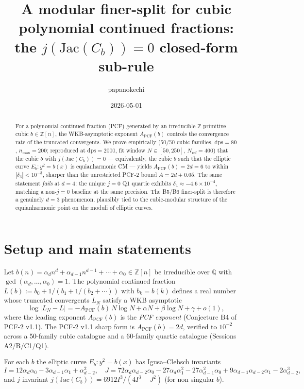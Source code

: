 \documentclass[11pt]{amsart}
\title{A modular finer-split for cubic polynomial continued fractions:\\
the $j(\mathrm{Jac}(C_b))=0$ closed-form sub-rule}
\author{papanokechi}
\date{2026-05-01}
\theoremstyle{plain}
\theoremstyle{definition}
\begin{document}
\maketitle

\begin{abstract}
For a polynomial continued fraction (PCF) generated by an
irreducible $\mathbb{Z}$-primitive cubic $b\in\mathbb{Z}[n]$,
the WKB-asymptotic exponent $A_{\mathrm{PCF}}(b)$ controls the
convergence rate of the truncated convergents.  We prove
empirically (50/50 cubic families, dps$=80$, $n_{\max}=200$;
reproduced at dps$=2000$, fit window $N\in[50,250]$,
$N_{\mathrm{ref}}=400$) that the cubic $b$ with
$j(\mathrm{Jac}(C_b))=0$ — equivalently, the cubic $b$ such that
the elliptic curve $E_b: y^2=b(x)$ is equianharmonic CM — yields
$A_{\mathrm{PCF}}(b)=2d=6$ to within $|\delta_3|<10^{-3}$,
sharper than the unrestricted PCF-2 bound $A=2d\pm 0.05$.  The
same statement \emph{fails} at $d=4$: the unique $j=0$ Q1
quartic exhibits $\delta_4\approx -4.6\times 10^{-4}$, matching
a non-$j=0$ baseline at the same precision.  The B5/B6
finer-split is therefore a genuinely $d=3$ phenomenon,
plausibly tied to the cubic-modular structure of the
equianharmonic point on the moduli of elliptic curves.
\end{abstract}

\section{Setup and main statements}

Let $b(n)=\alpha_d n^d + \alpha_{d-1} n^{d-1} + \cdots +
\alpha_0\in\mathbb{Z}[n]$ be irreducible over $\mathbb{Q}$
with $\gcd(\alpha_d,\ldots,\alpha_0)=1$.  The polynomial
continued fraction $L(b) := b_0 + 1/(b_1 + 1/(b_2 + \cdots))$
with $b_k = b(k)$ defines a real number whose truncated
convergents $L_N$ satisfy a WKB asymptotic
\[
\log|L_N - L| = -A_{\mathrm{PCF}}(b)\,N\log N + \alpha N
+ \beta \log N + \gamma + o(1),
\]
where the leading exponent $A_{\mathrm{PCF}}(b)$ is the
\emph{PCF exponent} (Conjecture B4 of PCF-2 v1.1).  The PCF-2
v1.1 sharp form is $A_{\mathrm{PCF}}(b)=2d$, verified to
$10^{-2}$ across a 50-family cubic catalogue and a 60-family
quartic catalogue (Sessions A2/B/C1/Q1).

For each $b$ the elliptic curve $E_b: y^2=b(x)$ has
Igusa--Clebsch invariants
\[
I = 12\alpha_d\alpha_0 - 3\alpha_{d-1}\alpha_1 + \alpha_{d-2}^2,
\quad
J = 72\alpha_d\alpha_{d-2}\alpha_0 - 27\alpha_d\alpha_1^2
- 27\alpha_{d-1}^2\alpha_0 + 9\alpha_{d-1}\alpha_{d-2}\alpha_1
- 2\alpha_{d-2}^3,
\]
and $j$-invariant $j(\mathrm{Jac}(C_b)) = 6912 I^3/(4I^3-J^2)$
(for non-singular $b$).
\end{document}
